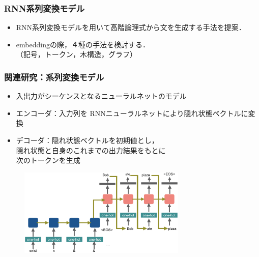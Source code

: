 \documentclass[dvipdfmx]{beamer}
\begin{document}
\begin{frame}
\frametitle{RNN系列変換モデル}
\begin{center}
\end{center}

\begin{itemize}
  \item {\color{berry}RNN系列変換モデル}を用いて高階論理式から文を生成する手法を提案．
  \item embeddingの際，４種の手法を検討する．\\（記号，トークン，木構造，グラフ）　
\end{itemize}


\end{frame}



\begin{frame}
\frametitle{関連研究：系列変換モデル\citep{seq2seq} }
\begin{itemize}
  \item 入出力がシーケンスとなるニューラルネットのモデル
  \item エンコーダ：入力列を RNNニューラルネットにより隠れ状態ベクトルに変換
  \item デコーダ：隠れ状態ベクトルを初期値とし，\\隠れ状態と自身のこれまでの出力結果をもとに\\次のトークンを生成
\end{itemize}

\begin{center}
\begin{figure}[h]
	\includegraphics[width=8cm]{learn_model.png}
        \label{fig:seq2seq}
\end{figure}
\end{center}

\end{frame}
\end{document}
